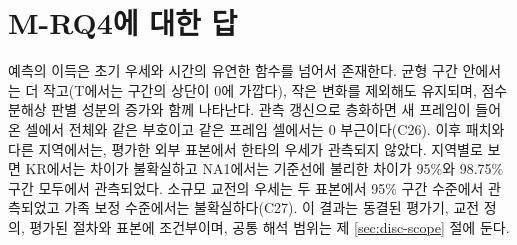 \section{M-RQ4에 대한 답}
\label{sec:val-answer-rq4}

예측의 이득은 초기 우세와 시간의 유연한 함수를 넘어서 존재한다. 균형 구간 안에서는 더 작고(T에서는 구간의 상단이 0에 가깝다), 작은 변화를 제외해도 유지되며, 점수 분해상 판별 성분의 증가와 함께 나타난다. 관측 갱신으로 층화하면 새 프레임이 들어온 셀에서 전체와 같은 부호이고 같은 프레임 셀에서는 0 부근이다(C26). 이후 패치와 다른 지역에서는, 평가한 외부 표본에서 한타의 우세가 관측되지 않았다. 지역별로 보면 KR에서는 차이가 불확실하고 NA1에서는 기준선에 불리한 차이가 95\%와 98.75\% 구간 모두에서 관측되었다. 소규모 교전의 우세는 두 표본에서 95\% 구간 수준에서 관측되었고 가족 보정 수준에서는 불확실하다(C27). 이 결과는 동결된 평가기, 교전 정의, 평가된 절차와 표본에 조건부이며, 공통 해석 범위는 제 \ref{sec:disc-scope} 절에 둔다.

